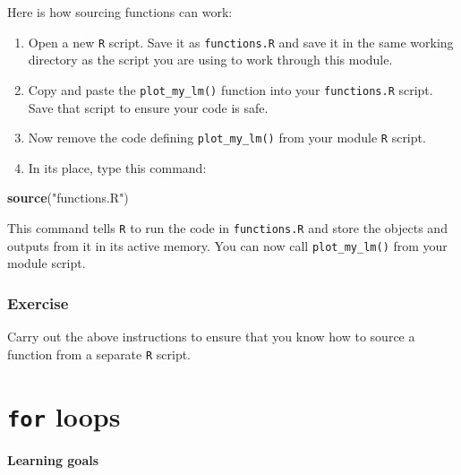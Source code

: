 \documentclass[
]{book}
\newenvironment{Shaded}{\begin{snugshade}}{\end{snugshade}}
\newcommand{\KeywordTok}[1]{\textcolor[rgb]{0.13,0.29,0.53}{\textbf{#1}}}
\newcommand{\NormalTok}[1]{#1}
\newcommand{\StringTok}[1]{\textcolor[rgb]{0.31,0.60,0.02}{#1}}
\begin{document}
Here is how sourcing functions can work:

\begin{enumerate}
\def\labelenumi{\arabic{enumi}.}
\item
  Open a new \texttt{R} script. Save it as \texttt{functions.R} and save it in the same working directory as the script you are using to work through this module.
\item
  Copy and paste the \texttt{plot\_my\_lm()} function into your \texttt{functions.R} script. Save that script to ensure your code is safe.
\item
  Now remove the code defining \texttt{plot\_my\_lm()} from your module \texttt{R} script.
\item
  In its place, type this command:
\end{enumerate}

\begin{Shaded}
\begin{Highlighting}[]
\KeywordTok{source}\NormalTok{(}\StringTok{"functions.R"}\NormalTok{)}
\end{Highlighting}
\end{Shaded}

This command tells \texttt{R} to run the code in \texttt{functions.R} and store the objects and outputs from it in its active memory. You can now call \texttt{plot\_my\_lm()} from your module script.

\hypertarget{exercise-7}{%
\subsection*{Exercise}\label{exercise-7}}

Carry out the above instructions to ensure that you know how to source a function from a separate \texttt{R} script.

\hypertarget{for-loops}{%
\chapter{\texorpdfstring{\texttt{for} loops}{for loops}}\label{for-loops}}

\hypertarget{learning-goals-16}{%
\subsubsection*{Learning goals}\label{learning-goals-16}}
\end{document}
